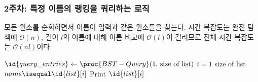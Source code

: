 \subsubsection{2주차: 특정 이름의 랭킹을 쿼리하는 로직} 모든 원소를 순회하면서 이름이 입력과 같은 원소들을 찾는다. 시간 복잡도는 완전 탐색에
$\mathcal{O}\left(n\right)$, 길이 $l$의 이름에 대해 이름 비교에 $\mathcal{O}\left(l\right)$이 걸리므로 전체 시간 복잡도는
$\mathcal{O}\left(nl\right)$이다.

\begin{codebox}
\li $\id{query\_entries} \gets \proc{BST-Query}(1,\,\mbox{size of list})$
\li \For $i = 1$ \To size of list \Do
\li     \If $name \isequal \id{list}[i]$ \Then
\li         Print $\id{list}[i]$
        \End
    \End
\end{codebox}